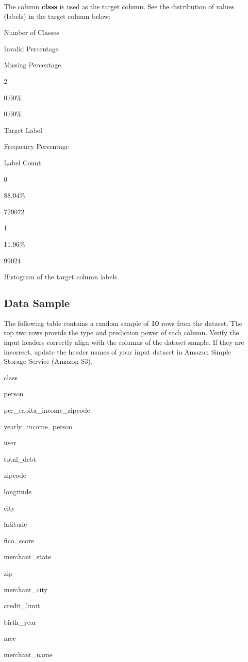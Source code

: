 \documentclass[11pt]{article}
\begin{document}
The column \textbf{class} is used as the target column. See the
distribution of values (labels) in the target column below:

Number of Classes

Invalid Percentage

Missing Percentage

2

0.00\%

0.00\%

Target Label

Frequency Percentage

Label Count

0

88.04\%

729072

1

11.96\%

99024

Histogram of the target column labels.

    \hypertarget{data-sample}{%
\subsection{Data Sample}\label{data-sample}}

The following table contains a random sample of \textbf{10} rows from
the dataset. The top two rows provide the type and prediction power of
each column. Verify the input headers correctly align with the columns
of the dataset sample. If they are incorrect, update the header names of
your input dataset in Amazon Simple Storage Service (Amazon S3).

class

person

per\_capita\_income\_zipcode

yearly\_income\_person

user

total\_debt

zipcode

longitude

city

latitude

fico\_score

merchant\_state

zip

merchant\_city

credit\_limit

birth\_year

mcc

merchant\_name
\end{document}
